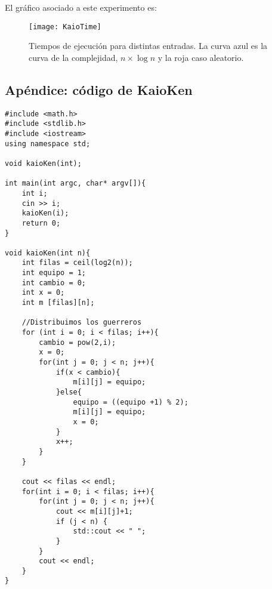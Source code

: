 \documentclass[10pt,a4paper]{article}
\begin{document}
El gráfico asociado a este experimento es:
\begin{figure}[h!]
  \centering
  \texttt{[image: KaioTime]}
  \caption{Tiempos de ejecución para distintas entradas. La curva azul es la curva de la complejidad, $n \times \log n$ y la roja caso aleatorio.}
\end{figure}







\newpage

\subsection{Apéndice: código de KaioKen}
\begin{lstlisting}
#include <math.h>
#include <stdlib.h>
#include <iostream>
using namespace std;

void kaioKen(int);

int main(int argc, char* argv[]){
	int i;
	cin >> i;
	kaioKen(i);
	return 0;
}

void kaioKen(int n){
	int filas = ceil(log2(n));
	int equipo = 1;
	int cambio = 0;
	int x = 0;
	int m [filas][n];

	//Distribuimos los guerreros
	for (int i = 0; i < filas; i++){
		cambio = pow(2,i);
		x = 0;
		for(int j = 0; j < n; j++){
			if(x < cambio){
				m[i][j] = equipo;
			}else{
				equipo = ((equipo +1) % 2);
				m[i][j] = equipo;
				x = 0;
			}
			x++;
		}
	}

	cout << filas << endl;
	for(int i = 0; i < filas; i++){
		for(int j = 0; j < n; j++){
			cout << m[i][j]+1;
			if (j < n) {
				std::cout << " ";
			}
		}
		cout << endl;
	}
}
\end{lstlisting}
\end{document}
